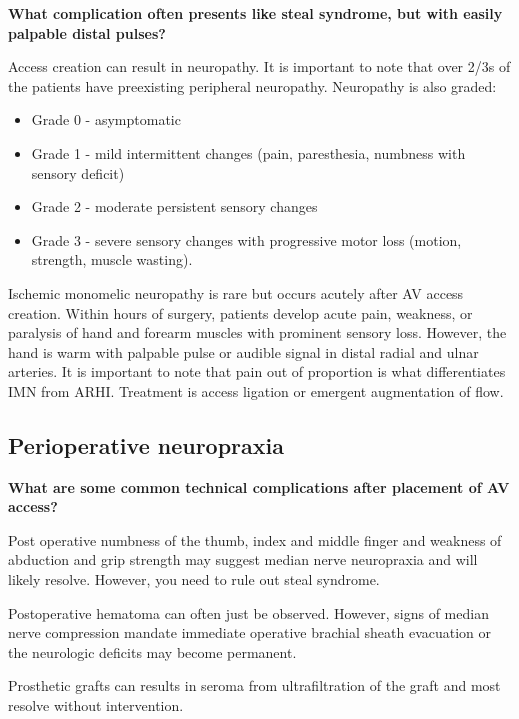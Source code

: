 \documentclass[
]{book}
\begin{document}
\textbf{What complication often presents like steal syndrome, but with easily
palpable distal pulses?}

Access creation can result in neuropathy. It is important to note that
over 2/3s of the patients have preexisting peripheral neuropathy.
Neuropathy is also graded:

\begin{itemize}
\item
  Grade 0 - asymptomatic
\item
  Grade 1 - mild intermittent changes (pain, paresthesia, numbness
  with sensory deficit)
\item
  Grade 2 - moderate persistent sensory changes
\item
  Grade 3 - severe sensory changes with progressive motor loss
  (motion, strength, muscle wasting).
\end{itemize}

Ischemic monomelic neuropathy is rare but occurs acutely after AV access
creation. Within hours of surgery, patients develop acute pain,
weakness, or paralysis of hand and forearm muscles with prominent
sensory loss. However, the hand is warm with palpable pulse or audible
signal in distal radial and ulnar arteries. It is important to note that
pain out of proportion is what differentiates IMN from ARHI. Treatment
is access ligation or emergent augmentation of flow.

\hypertarget{perioperative-neuropraxia}{%
\subsection{Perioperative neuropraxia}\label{perioperative-neuropraxia}}

\textbf{What are some common technical complications after placement of AV
access?}

Post operative numbness of the thumb, index and middle finger and
weakness of abduction and grip strength may suggest median nerve
neuropraxia and will likely resolve. However, you need to rule out steal
syndrome.\citep{talebi2011, vahdatpour2012}

Postoperative hematoma can often just be observed. However, signs of
median nerve compression mandate immediate operative brachial sheath
evacuation or the neurologic deficits may become
permanent.\citep{padberg2008}

Prosthetic grafts can results in seroma from ultrafiltration of the
graft and most resolve without intervention.
\end{document}
